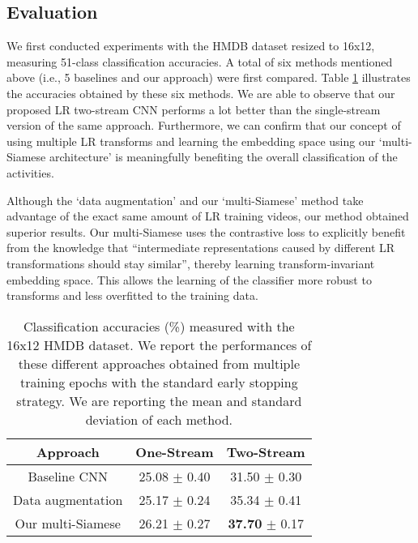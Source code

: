 \documentclass[letterpaper]{article} %
\begin{document}
\subsection{Evaluation}

We first conducted experiments with the HMDB dataset resized to 16x12, measuring 51-class classification accuracies. A total of six methods mentioned above (i.e., 5 baselines and our approach) were first compared. Table \ref{table:hmdb} illustrates the accuracies obtained by these six methods. We are able to observe that our proposed LR two-stream CNN performs a lot better than the single-stream version of the same approach. Furthermore, we can confirm that our concept of using multiple LR transforms and learning the embedding space using our `multi-Siamese architecture' is meaningfully benefiting the overall classification of the activities.

Although the `data augmentation' and our `multi-Siamese' method take advantage of the exact same amount of LR training videos, our method obtained superior results. Our multi-Siamese uses the contrastive loss to explicitly benefit from the knowledge that ``intermediate representations caused by different LR transformations should stay similar'', thereby learning transform-invariant embedding space. This allows the learning of the classifier more robust to transforms and less overfitted to the training data.



\begin{table}
	\caption{Classification accuracies (\%) measured with the 16x12 HMDB dataset. We report the performances of these different approaches obtained from multiple training epochs with the standard early stopping strategy. We are reporting the mean and standard deviation of each method.}
	\label{table:hmdb}

	\center
	\setlength\extrarowheight{0.5pt}

		\begin{tabular}{c|c|c}
			\hline 	Approach & One-Stream & Two-Stream \tabularnewline
			\hline 	Baseline CNN & 25.08 $\pm$ 0.40	& 	31.50 $\pm$ 0.30  \tabularnewline
			        Data augmentation & 25.17 $\pm$ 0.24	& 35.34 $\pm$ 0.41  \tabularnewline
			        Our multi-Siamese & 26.21 $\pm$ 0.27	& 	\textbf{37.70} $\pm$ 0.17	  \tabularnewline
			\hline
		\end{tabular}

\end{table}
\end{document}
